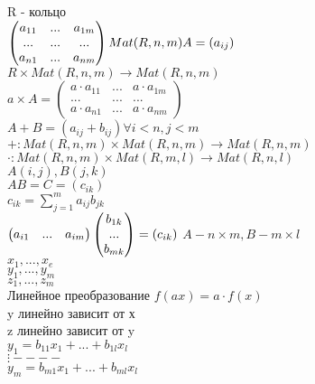 
R - кольцо\\
$ \begin{pmatrix}
	a_{11} & ... & a_{1m} \\
	...& ...& ... \\
	a_{n1} & ... & a_{nm}
\end{pmatrix}\\
Mat(R, n, m) \\
A = (a_{ij})$\\
$ R \times Mat(R, n, m) \rightarrow Mat(R, n, m) $\\
$ a \times A =  \begin{pmatrix}
a\cdot a_{11} & ... & a\cdot  a_{1m} \\
...& ...& ... \\
a\cdot  a_{n1} & ... & a\cdot a_{nm}
\end{pmatrix}$ \\
$ A + B = (a_{ij} + b_{ij})  \forall i < n, j < m$ \\
$ + : Mat(R, n, m) \times Mat(R, n, m) \rightarrow Mat(R, n, m) $\\
$ \cdot : Mat(R, n, m) \times Mat(R, m, l) \rightarrow Mat(R, n, l) $ \\
$ A (i, j), B(j, k) $ \\
$ AB = C = (c_{i k}) $ \\
$ c_{ik} = \sum_{j=1}^{m} a_{ij} b_{jk} $ \\
$ \begin{pmatrix}
	a_{i1} & ... & a_{im} \\
\end{pmatrix}  \begin{pmatrix}
	b_{1k}  \\
	...  \\
	b_{mk}
\end{pmatrix} = (c_{ik})\\$
$A - n \times m, B - m \times l $\\
$ x_1, ..., x_e $ \\
$y_1, ..., y_m $ \\
$z_1, ..., z_m $ \\
Линейное преобразование $ f(ax) = a \cdot f(x) $\\ 
y линейно зависит от х \\
z линейно зависит от y\\
$ y_1 = b_{11} x_1 + ... + b_{1l}x_l $ \\
$ \vdots ---- $\\
$ y_m = b_{m1}x_1 + ...+ b_{ml} x_l$

